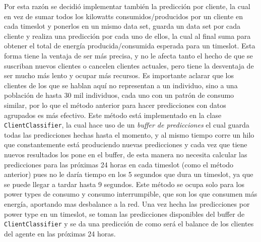 Por esta razón se decidió implementar también la predicción por cliente, la cual en vez de sumar todos los kilowatts consumidos/producidos por un cliente en cada timeslot y ponerlos en un mismo data set, guarda un data set por cada cliente y realiza una predicción por cada uno de ellos, la cual al final suma para obtener el total de energía producida/consumida esperada para un timeslot. 
Esta forma tiene la ventaja de ser más precisa, y no le afecta tanto el hecho de que se suscriban nuevos clientes o cancelen clientes actuales, pero tiene la desventaja de ser mucho más lento y ocupar más recursos. 
Es importante aclarar que los clientes de los que se hablan aquí no representan a un individuo, sino a una población de hasta 30 mil individuos, cada uno con un patrón de consumo similar, por lo que el método anterior para hacer predicciones con datos agrupados es más efectivo.
Este método está implementado en la clase \texttt{ClientClassifier}, la cual hace uso de un \textit{buffer de predicciones} el cual guarda todas las predicciones hechas hasta el momento, y al mismo tiempo corre un hilo que constantemente está produciendo nuevas predicciones y cada vez que tiene nuevos resultados los pone en el buffer, de esta manera no necesita calcular las predicciones para las próximas 24 horas en cada timeslot (como el método anterior) pues no le daría tiempo en los 5 segundos que dura un timeslot, ya que se puede llegar a tardar hasta 9 segundos. Este método se ocupa solo para los power types de consumo y consumo interrumpible, que son los que consumen más energía, aportando mas desbalance a la red.
Una vez hecha las predicciones por power type en un timeslot, se toman las predicciones disponibles del buffer de \texttt{ClientClassifier} y se da una predicción de como será el balance de los clientes del agente en las próximas 24 horas.


